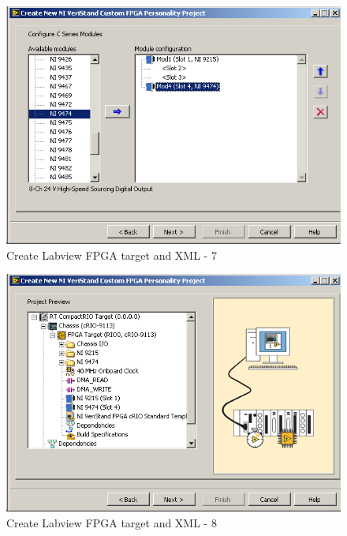 \begin{figure}[htb!]
	\centering \includegraphics[scale=0.45]{Screenshots/Screenshot_2015-01-16_19-25-37.png}
	\caption{Create Labview FPGA target and XML - 7}
	\label{fig: Create Labview FPGA target and XML-7} 
\end{figure}
\begin{figure}[htb!]
	\centering \includegraphics[scale=0.45]{Screenshots/Screenshot_2015-01-16_19-25-54.png}
	\caption{Create Labview FPGA target and XML - 8}
	\label{fig: Create Labview FPGA target and XML-8} 
\end{figure}
